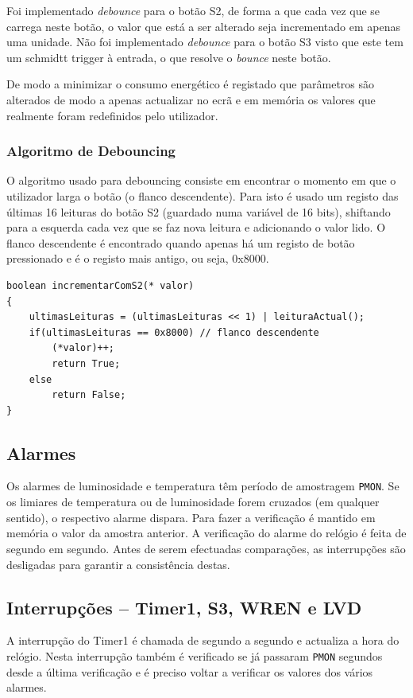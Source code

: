 \documentclass[a4paper,12pt]{article}
\begin{document}
Foi implementado \textit{debounce} para o botão S2, de forma a que cada vez que se carrega neste botão, o valor que está a ser alterado seja incrementado em apenas uma unidade. Não foi implementado \textit{debounce} para o botão S3 visto que este tem um schmidtt trigger à entrada, o que resolve o \textit{bounce} neste botão.

De modo a minimizar o consumo energético é registado que parâmetros são alterados de modo a apenas actualizar no ecrã e em memória os valores que realmente foram redefinidos pelo utilizador.

\subsubsection{Algoritmo de Debouncing}
O algoritmo usado para debouncing consiste em encontrar o momento em que o utilizador larga o botão (o flanco descendente). Para isto é usado um registo das últimas 16 leituras do botão S2 (guardado numa variável de 16 bits), shiftando para a esquerda cada vez que se faz nova leitura e adicionando o valor lido. O flanco descendente é encontrado quando apenas há um registo de botão pressionado e é o registo mais antigo, ou seja, 0x8000.
\begin{lstlisting}
boolean incrementarComS2(* valor)
{
	ultimasLeituras = (ultimasLeituras << 1) | leituraActual();
	if(ultimasLeituras == 0x8000) // flanco descendente
		(*valor)++;
		return True;
	else
		return False;
}
\end{lstlisting}

\subsection{Alarmes}

Os alarmes de luminosidade e temperatura têm período de amostragem \texttt{PMON}. Se os limiares de temperatura ou de luminosidade forem cruzados (em qualquer sentido), o respectivo alarme dispara. Para fazer a verificação é mantido em memória o valor da amostra anterior.
A verificação do alarme do relógio é feita de segundo em segundo. Antes de serem efectuadas comparações, as interrupções são desligadas para garantir a consistência destas.

\subsection{Interrupções -- Timer1, S3, WREN e LVD}

A interrupção do Timer1 é chamada de segundo a segundo e actualiza a hora do relógio. Nesta interrupção também é verificado se já passaram \texttt{PMON} segundos desde a última verificação e é preciso voltar a verificar os valores dos vários alarmes.
\end{document}

